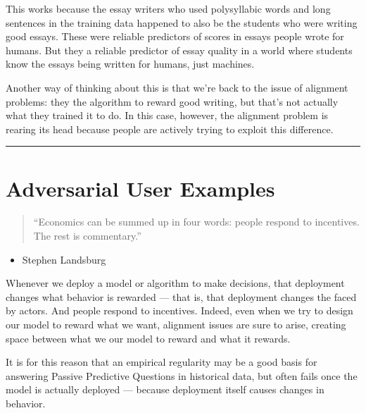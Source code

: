 \documentclass[letterpaper,10pt,english]{jupyterBook}
\begin{document}
\sphinxAtStartPar
This works because the essay writers who used polysyllabic words and long sentences in the training data happened to also be the students who were writing good essays. These were reliable predictors of scores in essays people wrote for humans. But they  a reliable predictor of essay quality in a world where students know the essays  being written for humans, just machines.

\sphinxAtStartPar
Another way of thinking about this is that we’re back to the issue of alignment problems: they  the algorithm to reward good writing, but that’s not actually what they trained it to do. In this case, however, the alignment problem is rearing its head because people are actively trying to exploit this difference.


\bigskip\hrule\bigskip


\sphinxstepscope


\section{Adversarial User Examples}
\label{\detokenize{30_questions/29_passive_external_adversarial_users_examples:adversarial-user-examples}}\label{\detokenize{30_questions/29_passive_external_adversarial_users_examples::doc}}\begin{quote}

\sphinxAtStartPar
“Economics can be summed up in four words: people respond to incentives. The rest is commentary.”
\end{quote}
\begin{itemize}
\item {} 
\sphinxAtStartPar
Stephen Landsburg

\end{itemize}

\sphinxAtStartPar
Whenever we deploy a model or algorithm to make decisions, that deployment changes what behavior is rewarded — that is, that deployment changes the  faced by actors. And people respond to incentives. Indeed, even when we try to design our model to reward  what we want, alignment issues are sure to arise, creating space between what we  our model to reward and what it  rewards.

\sphinxAtStartPar
It is for this reason that an empirical regularity may be a good basis for answering Passive Predictive Questions in historical data, but often fails once the model is actually deployed — because deployment itself causes changes in behavior.
\end{document}
